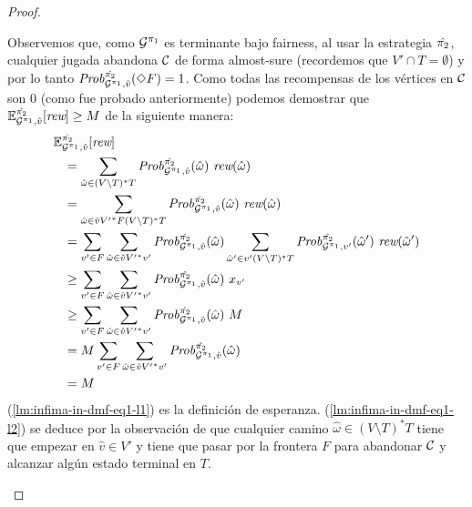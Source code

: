 \begin{proof}
\begin{proofofclaim}
    Observemos que, como $\mathcal{G}^{\pi_{1}}$ es terminante bajo fairness,
    al usar la estrategia $\hat{\pi_{2}}$, cualquier jugada abandona $\mathcal{C}$ de forma almost-sure (recordemos que $V' \cap T = \emptyset$) y por lo tanto
    $\mathit{Prob}^{\hat{\pi_{2}}}_{\mathcal{G}^{\pi_{1}},\hat{v}} (\Diamond F) = 1$.
    Como todas las recompensas de los vértices en $\mathcal{C}$ son $0$ (como fue probado anteriormente) podemos demostrar que
    $\mathbb{E}^{\hat{\pi_{2}}}_{\mathcal{G}^{\pi_{1}},\hat{v}}[\textit{rew}]
    \geq M$ de la siguiente manera:
    \begin{align}	
      \ExpectMDP{\hat{\strat{2}}}_{\StochG^{\strat{1}},\hat{v}}[\Rewards] \hspace{-4em} & \notag\\
      \label{lm:infima-in-dmf-eq1-l1}
      &= \sum_{\hat{\omega} \in (V \setminus T)^*T} \MDPProb{\hat{\strat{2}}}_{\StochG^{\strat{1}},\hat{v}}(\hat{\omega})\ \Rewards(\hat{\omega}) \\
      \label{lm:infima-in-dmf-eq1-l2}
      &=\sum_{\hat{\omega} \in \hat{v}{V'}^*F(V \setminus T)^*T} \MDPProb{\hat{\strat{2}}}_{\StochG^{\strat{1}},\hat{v}}(\hat{\omega})\ \Rewards(\hat{\omega}) \\
      \label{lm:infima-in-dmf-l3}
      &= \sum_{v' \in F} \sum_{\hat{\omega} \in \hat{v}{V'}^*v'} \MDPProb{\hat{\strat{2}}}_{\StochG^{\strat{1}},\hat{v}}(\hat{\omega}) \sum_{\hat{\omega}' \in v' (V \setminus T)^*T}  \MDPProb{\hat{\strat{2}}}_{\StochG^{\strat{1}},v'}(\hat{\omega}')\ \Rewards(\hat{\omega}')\\
      \label{lm:infima-in-dmf-l4}
      &\geq \sum_{v' \in F} \sum_{\hat{\omega} \in \hat{v}{V'}^*v'} \MDPProb{\hat{\strat{2}}}_{\StochG^{\strat{1}},\hat{v}}(\hat{\omega})\ x_{v'} \\
      \label{lm:infima-in-dmf-l5}
      &\geq \sum_{v' \in F} \sum_{\hat{\omega} \in \hat{v}{V'}^*v'} \MDPProb{\hat{\strat{2}}}_{\StochG^{\strat{1}},\hat{v}}(\hat{\omega})\ M \\
      \label{lm:infima-in-dmf-l6}
      &= M  \sum_{v' \in F} \sum_{\hat{\omega} \in \hat{v}{V'}^*v'} \MDPProb{\hat{\strat{2}}}_{\StochG^{\strat{1}},\hat{v}}(\hat{\omega}) \\
      \label{lm:infima-in-dmf-l7}
      &= M
    \end{align}
    (\ref{lm:infima-in-dmf-eq1-l1}) es la definición de esperanza.
    (\ref{lm:infima-in-dmf-eq1-l2}) se deduce por la observación de que cualquier camino $\hat{\omega} \in (V \setminus T)^*T$ tiene que empezar en
    $\hat{v}\in V'$ y tiene que pasar por la frontera $F$ para abandonar $\mathcal{C}$ y alcanzar algún estado terminal en $T$.

\end{proofofclaim}
\end{proof}
